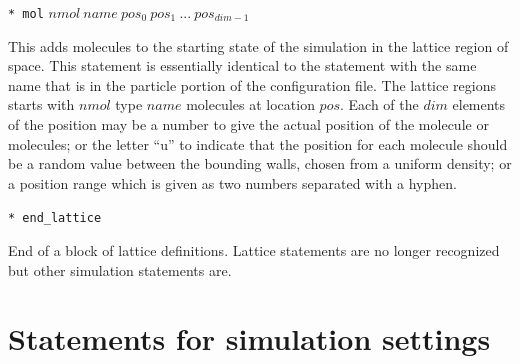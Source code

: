 \documentclass {scrbook}
\newcommand {\ttt} {\texttt}
\begin{document}
\begin{description}
\item{\ttt{* mol} $nmol\ name\ pos_0\ pos_1\ ...\ pos_{dim-1}$}

This adds molecules to the starting state of the simulation in the lattice region of space. This statement is essentially identical to the statement with the same name that is in the particle portion of the configuration file. The lattice regions starts with $nmol$ type $name$ molecules at location $pos$. Each of the $dim$ elements of the position may be a number to give the actual position of the molecule or molecules; or the letter ``u'' to indicate that the position for each molecule should be a random value between the bounding walls, chosen from a uniform density; or a position range which is given as two numbers separated with a hyphen.

\item{\ttt{* end\_lattice}}

End of a block of lattice definitions. Lattice statements are no longer recognized but other simulation statements are.

\end{description}

\section{Statements for simulation settings}
\end{document}
